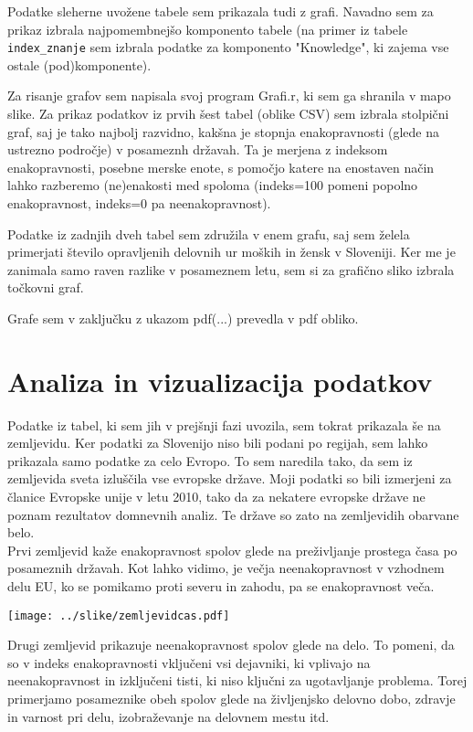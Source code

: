 \documentclass[11pt,a4paper]{article}
\begin{document}
Podatke sleherne uvožene tabele sem prikazala tudi z grafi. Navadno sem za prikaz izbrala najpomembnejšo komponento tabele (na primer iz tabele \verb-index_znanje- sem izbrala podatke za komponento "Knowledge", ki zajema vse ostale (pod)komponente). 

Za risanje grafov sem napisala svoj program Grafi.r, ki sem ga shranila v mapo slike.
Za prikaz podatkov iz prvih šest tabel (oblike CSV) sem izbrala stolpični graf, saj je tako najbolj razvidno, kakšna je stopnja enakopravnosti (glede na ustrezno področje) v posameznh  državah. Ta je merjena z indeksom enakopravnosti, posebne merske enote, s pomočjo katere na enostaven način lahko razberemo (ne)enakosti med spoloma (indeks=100 pomeni popolno enakopravnost, indeks=0 pa neenakopravnost).

Podatke iz zadnjih dveh tabel sem združila v enem grafu, saj sem želela primerjati število opravljenih delovnih ur moških in žensk v Sloveniji. Ker me je zanimala samo raven razlike v posameznem letu, sem si za grafično sliko izbrala točkovni graf.

Grafe sem v zaključku z ukazom pdf(...) prevedla v pdf obliko.



\section{Analiza in vizualizacija podatkov}

Podatke iz tabel, ki sem jih v prejšnji fazi uvozila, sem tokrat prikazala še na zemljevidu.
Ker podatki za Slovenijo niso bili podani po regijah, sem lahko prikazala samo podatke za celo Evropo. To sem naredila tako, da sem iz zemljevida sveta izluščila vse evropske države. Moji podatki so bili izmerjeni za članice Evropske unije v letu 2010, tako da za nekatere evropske države ne poznam rezultatov domnevnih analiz. Te države so zato na zemljevidih obarvane belo.\\
\vspace{5mm}
Prvi zemljevid kaže enakopravnost spolov glede na preživljanje prostega časa po posameznih državah. Kot lahko vidimo, je večja neenakopravnost v vzhodnem delu EU, ko se pomikamo proti severu in zahodu, pa se enakopravnost veča.

\texttt{[image: ../slike/zemljevidcas.pdf]}

\newpage
Drugi zemljevid prikazuje neenakopravnost spolov glede na delo. To pomeni, da so v indeks enakopravnosti vključeni vsi dejavniki, ki vplivajo na neenakopravnost in izključeni tisti, ki niso ključni za ugotavljanje problema. Torej primerjamo posameznike obeh spolov glede na
življenjsko delovno dobo, zdravje in varnost pri delu, izobraževanje na delovnem mestu itd.
\end{document}
